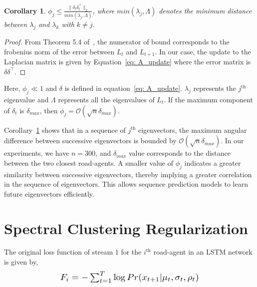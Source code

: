 \documentclass[10pt,twocolumn,letterpaper]{article}
\newcommand{\bigO}[1]{\mathcal{O}(#1)}
\newcommand{\Vts}[1]{\lVert #1 \rVert}
\theoremstyle{plain}
\newtheorem{corollary}{Corollary}[section]
\begin{document}
\begin{corollary}
    $\phi_j \leq \frac{  \Vts{\delta_t\delta_t^\top}_2  }{  min(\lambda_j, \Lambda)  }$, where $min(\lambda_j, \Lambda)$ denotes the minimum distance between $\lambda_j$ and $\lambda_k$ with $k \neq j$.
    \label{eq: theoretical_bound}
\end{corollary}

\begin{proof}
From Theorem 5.4 of~\cite{demmel1997applied}, the numerator of bound corresponds to the frobenius norm of the error between $L_t$ and $L_{t+1}$. In our case, the update to the Laplacian matrix is given by Equation~\ref{eq: A_update} where the error matrix is $\delta \delta^\top$. 
\end{proof}


\noindent Here, $\phi_j \ll 1$ and $\delta$ is defined in equation~\ref{eq: A_update}. $\lambda_j$ represents the $j^{\textrm{th}}$ eigenvalue and $\Lambda$ represents all the eigenvalues of $L_t$. If the maximum component of $\delta_t$ is $\delta_{max}$, then $\phi_j = \bigO{\sqrt{n} \delta_{max}}$.

Corollary~\ref{eq: theoretical_bound} shows that in a sequence of $j^{\textrm{th}}$ eigenvectors, the maximum angular difference between successive eigenvectors is bounded by $\bigO{\sqrt{n} \delta_{max}}$. In our experiments, we have $n=300$, and $\delta_{max}$ value corresponds to the distance between the two closest road-agents. A smaller value of $\phi_j$ indicates a greater similarity between successive eigenvectors, thereby implying a greater correlation in the sequence of eigenvectors. This allows sequence prediction models to learn future eigenvectors efficiently.

 \section{Spectral Clustering Regularization}
\label{sec: spectral_clustering}



The original loss function of stream 1 for the $i^{\textrm{th}}$ road-agent in an LSTM network is given by,
\begin{equation}
\resizebox{0.6\columnwidth}{!}{
    $F_i = -\sum_{t=1}^T \log Pr(x_{t+1} | \mu_t, \sigma_t, \rho_t)$
    }
    \label{eq: original_loss}
\end{equation}
\end{document}
